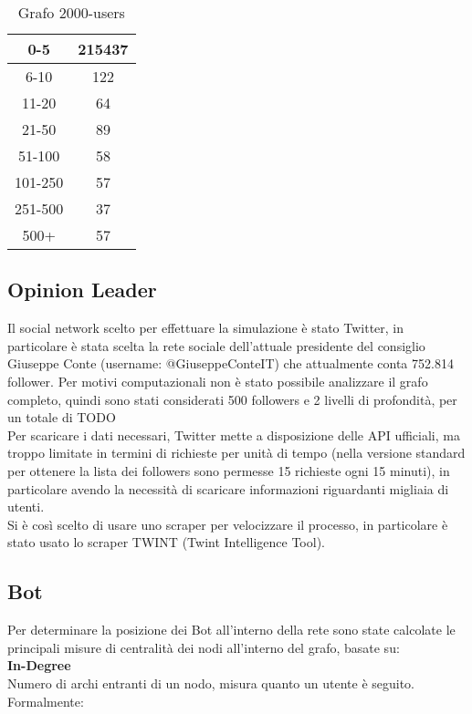     \begin{table}[h!]
    \begin{tabular}{ |c|c| }
     \hline
     0-5 & 215437 \\
     \hline
     6-10 & 122 \\
     \hline
     11-20 & 64 \\
     \hline
     21-50 & 89 \\
     \hline
     51-100 & 58 \\
     \hline
     101-250 & 57 \\
     \hline
     251-500 & 37 \\
     \hline
     500+ & 57 \\
     \hline
    \end{tabular}
    \caption{Grafo 2000-users}
    \end{table}
    \subsection{Opinion Leader}
    Il social network scelto per effettuare la simulazione è stato Twitter, in particolare è stata scelta la rete sociale dell’attuale presidente del consiglio Giuseppe Conte (username: @GiuseppeConteIT\cite{twitterGiuseppeConte}) che attualmente conta 752.814 follower. Per motivi computazionali non è stato possibile analizzare il grafo completo, quindi sono stati considerati 500 followers e 2 livelli di profondità, per un totale di TODO \\
    Per scaricare i dati necessari, Twitter mette a disposizione delle API ufficiali, ma troppo limitate in termini di richieste per unità di tempo (nella versione standard per ottenere la lista dei followers sono permesse 15 richieste ogni 15 minuti), in particolare avendo la necessità di scaricare informazioni riguardanti migliaia di utenti.\\
    Si è così scelto di usare uno scraper per velocizzare il processo, in particolare è stato usato lo scraper TWINT\cite{Twint} (Twint Intelligence Tool).
    \subsection{Bot}
    Per determinare la posizione dei Bot all'interno della rete sono state calcolate le principali misure di centralità dei nodi all'interno del grafo, basate su:
    \\
    \textbf{In-Degree}
    \\
    Numero di archi entranti di un nodo, misura quanto un utente è seguito.\\
    Formalmente:

